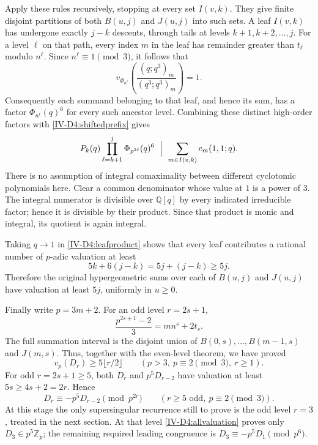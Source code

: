 \documentclass[11pt,letterpaper]{article}
\numberwithin{equation}{section}
\begin{document}
Apply these rules recursively, stopping at every set $I(v,k)$.
They give finite disjoint partitions of both $B(u,j)$ and
$J(u,j)$ into such sets.  A leaf $I(v,k)$ has undergone exactly
$j-k$ descents, through tails at levels $k+1,k+2,\ldots,j$.
For a level $\ell$ on that path, every index $m$ in the leaf
has remainder greater than $t_\ell$ modulo $n^\ell$.
Since $n^\ell\equiv1\pmod3$, it follows that
\[
 v_{\Phi_{n^\ell}}\left(\frac{(q;q^3)_m}{(q^3;q^3)_m}\right)=1.
\]
Consequently each summand belonging to that leaf, and hence its
sum, has a factor $\Phi_{n^\ell}(q)^6$ for every such ancestor
level.  Combining these distinct high-order factors with
\eqref{IV-D4:shiftedprefix} gives
\begin{equation}\label{IV-D4:leafproduct}
 P_k(q)\prod_{\ell=k+1}^{j}\Phi_{p^{2\ell}}(q)^6
       \ \Bigm|\ \sum_{m\in I(v,k)}c_m(1,1;q).
\end{equation}
There is no assumption of integral comaximality between different
cyclotomic polynomials here.  Clear a common denominator whose
value at $1$ is a power of $3$.  The integral numerator is
divisible over $\mathbb Q[q]$ by every indicated irreducible
factor; hence it is divisible by their product.  Since that
product is monic and integral, its quotient is again integral.

Taking $q\to1$ in \eqref{IV-D4:leafproduct} shows that every leaf
contributes a rational number of $p$-adic valuation at least
\[
 5k+6(j-k)=5j+(j-k)\ge5j.
\]
Therefore the original hypergeometric sums over each of
$B(u,j)$ and $J(u,j)$ have valuation at least $5j$, uniformly
in $u\ge0$.

Finally write $p=3m+2$.  For an odd level $r=2s+1$,
\[
 \frac{p^{2s+1}-2}{3}=mn^s+2t_s.
\]
The full summation interval is the disjoint union of
$B(0,s),\ldots,B(m-1,s)$ and $J(m,s)$.  Thus, together with
the even-level theorem, we have proved
\begin{equation}\label{IV-D4:allvaluation}
 \boxed{\quad v_p(D_r)\ge5\lfloor r/2\rfloor
       \qquad(p>3,\ p\equiv2\pmod3,\ r\ge1).\quad}
\end{equation}
For odd $r=2s+1\ge5$, both $D_r$ and $p^5D_{r-2}$ have
valuation at least $5s\ge4s+2=2r$.  Hence
\[
 \boxed{D_r\equiv-p^5D_{r-2}\pmod{p^{2r}}
       \qquad(r\ge5\text{ odd},\ p\equiv2\pmod3).}
\]
At this stage the only supersingular recurrence still to prove
is the odd level $r=3$, treated in the next section.
At that level \eqref{IV-D4:allvaluation} proves only $D_3\in p^5
\mathbb Z_p$; the remaining required leading congruence is
$D_3\equiv-p^5D_1\pmod{p^6}$.
\end{document}
